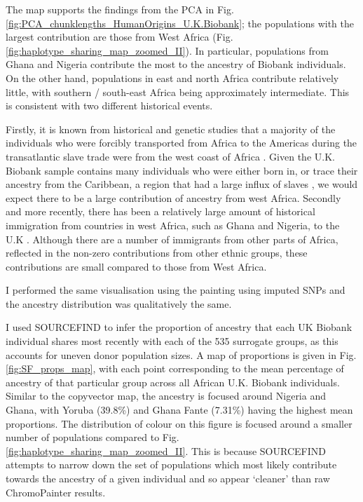 The map supports the findings from the PCA in Fig. \ref{fig:PCA_chunklengths_HumanOrigins_U.K.Biobank}; the populations with the largest contribution are those from West Africa (Fig. \ref{fig:haplotype_sharing_map_zoomed_II}). In particular, populations from Ghana and Nigeria contribute the most to the ancestry of Biobank individuals. On the other hand, populations in east and north Africa contribute relatively little, with southern / south-east Africa being approximately intermediate. This is consistent with two different historical events. 

Firstly, it is known from historical and genetic studies that a majority of the individuals who were forcibly transported from Africa to the Americas during the transatlantic slave trade were from the west coast of Africa \cite{micheletti2020genetic}. Given the U.K. Biobank sample contains many individuals who were either born in, or trace their ancestry from the Caribbean, a region that had a large influx of slaves \cite{rawley2005transatlantic}, we would expect there to be a large contribution of ancestry from west Africa. Secondly and more recently, there has been a relatively large amount of historical immigration from countries in west Africa, such as Ghana and Nigeria, to the U.K \cite{banton1953recent}. Although there are a number of immigrants from other parts of Africa, reflected in the non-zero contributions from other ethnic groups, these contributions are small compared to those from West Africa.

I performed the same visualisation using the painting using imputed SNPs and the ancestry distribution was qualitatively the same. 

I used SOURCEFIND to infer the proportion of ancestry that each UK Biobank individual shares most recently with each of the 535 surrogate groups, as this accounts for uneven donor population sizes. A map of proportions is given in Fig. \ref{fig:SF_props_map}, with each point corresponding to the mean percentage of ancestry of that particular group across all African U.K. Biobank individuals. Similar to the copyvector map, the ancestry is focused around Nigeria and Ghana, with Yoruba (39.8\%) and Ghana Fante (7.31\%) having the highest mean proportions. The distribution of colour on this figure is focused around a smaller number of populations compared to Fig. \ref{fig:haplotype_sharing_map_zoomed_II}. This is because SOURCEFIND attempts to narrow down the set of populations which most likely contribute towards the ancestry of a given individual and so appear `cleaner' than raw ChromoPainter results. 

